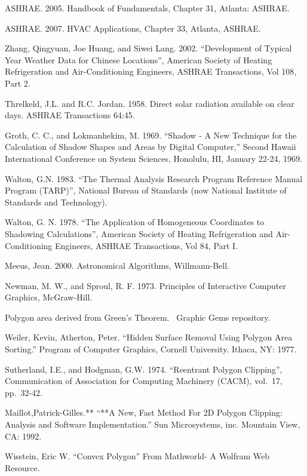 ASHRAE. 2005. Handbook of Fundamentals, Chapter 31, Atlanta: ASHRAE.

ASHRAE. 2007. HVAC Applications, Chapter 33, Atlanta, ASHRAE.

Zhang, Qingyuan, Joe Huang, and Siwei Lang. 2002. ``Development of Typical Year Weather Data for Chinese Locations'', American Society of Heating Refrigeration and Air-Conditioning Engineers, ASHRAE Transactions, Vol 108, Part 2.

Threlkeld, J.L. and R.C. Jordan. 1958. Direct solar radiation available on clear days. ASHRAE Transactions 64:45.

Groth, C. C., and Lokmanhekim, M. 1969. ``Shadow ‑ A New Technique for the Calculation of Shadow Shapes and Areas by Digital Computer,'' Second Hawaii International Conference on System Sciences, Honolulu, HI, January 22‑24, 1969.

Walton, G.N. 1983. ``The Thermal Analysis Research Program Reference Manual Program (TARP)'', National Bureau of Standards (now National Institute of Standards and Technology).

Walton, G. N. 1978. ``The Application of Homogeneous Coordinates to Shadowing Calculations'', American Society of Heating Refrigeration and Air-Conditioning Engineers, ASHRAE Transactions, Vol 84, Part I.

Meeus, Jean. 2000. Astronomical Algorithms, Willmann-Bell.

Newman, M. W., and Sproul, R. F. 1973. Principles of Interactive Computer Graphics, McGraw‑Hill.

Polygon area derived from Green's Theorem.~ Graphic Gems repository.

Weiler, Kevin, Atherton, Peter. ``Hidden Surface Removal Using Polygon Area Sorting.'' Program of Computer Graphics, Cornell University. Ithaca, NY: 1977.

Sutherland, I.E., and Hodgman, G.W. 1974. ``Reentrant Polygon Clipping'', Communication of Association for Computing Machinery (CACM), vol.~17, pp.~32-42.

Maillot,Patrick-Gilles.** ``**A New, Fast Method For 2D Polygon Clipping: Analysis and Software Implementation.'' Sun Microsystems, inc. Mountain View, CA: 1992.

Wisstein, Eric W. ``Convex Polygon'' From Mathworld- A Wolfram Web Resource.

